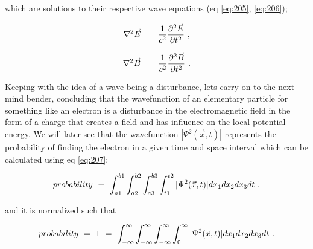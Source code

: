 \documentclass{article}
\begin{document}
which are solutions to their respective wave equations (eq \ref{eq:205}, \ref{eq:206});

\begin{equation} \label{eq:205}
\nabla^{2}\vec{E} \hspace{0.125cm} = \hspace{0.125cm} \frac{1}{c^{2}}\frac{\partial^{2}{\vec{E}}}{\partial{t^{2}}} \hspace{0.125cm} , 
\end{equation}

\begin{equation} \label{eq:206}
\nabla^{2}\vec{B} \hspace{0.125cm} = \hspace{0.125cm} \frac{1}{c^{2}}\frac{\partial^{2}{\vec{B}}}{\partial{t^{2}}} \hspace{0.125cm} . 
\end{equation}

Keeping with the idea of a wave being a disturbance, lets carry on to the next mind bender, concluding that the wavefunction of an elementary particle for something like an electron is a disturbance in the electromagnetic field in the form of a charge that creates a field and has influence on the local potential energy. We will later see that the wavefunction \begin{math} |\Psi^2(\vec{x},t)| \end{math} represents the probability of finding the electron in a given time and space interval which can be calculated using eq \ref{eq:207};

\begin{equation} \label{eq:207}
probability \hspace{0.125cm} = \hspace{0.125cm} \int_{a1}^{b1}\int_{a2}^{b2}\int_{a3}^{b3}\int_{t1}^{t2} |\Psi^2(\vec{x},t)| dx_{1}dx_{2}dx_{3}dt \hspace{0.125cm} , 
\end{equation}

and it is normalized such that

\begin{equation} \label{eq:208}
probability \hspace{0.125cm} = \hspace{0.125cm} 1 \hspace{0.125cm} = \hspace{0.125cm} \int_{-\infty}^{\infty}\int_{-\infty}^{\infty}\int_{-\infty}^{\infty}\int_{0}^{\infty} |\Psi^2(\vec{x},t)| dx_{1}dx_{2}dx_{3}dt \hspace{0.125cm} .
\end{equation}
\end{document}
